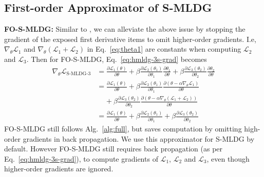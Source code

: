 \documentclass[runningheads]{llncs}
\newcommand{\nameS}{S-MLDG}
\newcommand{\nameFS}{FO-\nameS}
\newcommand{\keypoint}[1]{\vspace{0.1cm}\noindent\textbf{#1}\quad}
\begin{document}
\subsection{First-order Approximator of \nameS{}} 
\keypoint{\nameFS{}:} 
Similar to \cite{finn2017model}, we can alleviate the above issue by stopping the gradient of the exposed first derivative items to omit higher-order gradients. I.e, $\nabla_\theta\mathcal{L}_1$ and $\nabla_\theta(\mathcal{L}_1 +\mathcal{L}_2)$ in Eq.~\ref{eq:theta1} are constants when computing $\mathcal{L}_2$ and $\mathcal{L}_3$. Then for \nameFS{}, Eq.~\ref{eq:hmldg-3s-grad} becomes
\small
\begin{equation}
\begin{aligned}
\label{eq:hmldg-3s-fo}
\nabla_\theta\mathcal{L}_{\text{\nameS{}-3}} & = \frac{\partial \mathcal{L}_1(\theta)}{\partial \theta} + \beta \frac{\partial \mathcal{L}_2(\theta_1)}{\partial \theta_1}\frac{\partial \theta_1}{\partial \theta} + \beta\frac{\partial \mathcal{L}_3(\theta_2)}{\partial \theta_2}\frac{\partial \theta_2}{\partial \theta} \\
& = \frac{\partial \mathcal{L}_1(\theta)}{\partial \theta} + \beta \frac{\partial \mathcal{L}_2(\theta_1)}{\partial \theta_1}\frac{\partial (\theta -\alpha \nabla_{\theta}\mathcal{L}_1 )}{\partial \theta} \\
&~~~~~+ \beta\frac{\partial \mathcal{L}_3(\theta_2)}{\partial \theta_2}\frac{\partial (\theta-\alpha\nabla_\theta(\mathcal{L}_1 +\mathcal{L}_2))}{\partial \theta}\\
& = \frac{\partial \mathcal{L}_1(\theta)}{\partial \theta} + \beta \frac{\partial \mathcal{L}_2(\theta_1)}{\partial \theta_1} + \beta\frac{\partial \mathcal{L}_3(\theta_2)}{\partial \theta_2}
\end{aligned}
\end{equation}
\normalsize
\nameFS{} still follows Alg.~\ref{alg:full}, but saves computation by omitting high-order gradients in back propagation. We use this approximator for \nameS{} by default.
However \nameFS{} still requires back propagation (as per Eq.~\ref{eq:hmldg-3s-grad}), to compute gradients of $\mathcal{L}_1$, $\mathcal{L}_2$ and $\mathcal{L}_3$, even though higher-order gradients are ignored.
\end{document}
